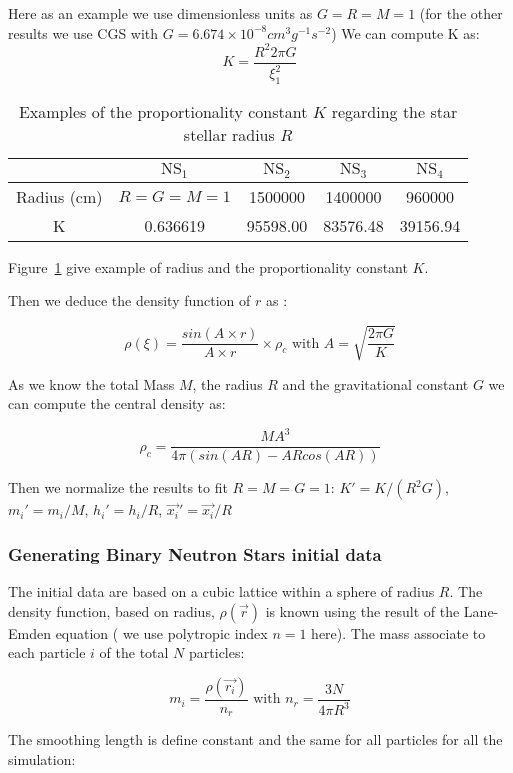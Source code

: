 Here as an example we use dimensionless units as $G=R=M=1$ (for the other results we use CGS with $G = 6.674 \times 10^{-8} cm^3g^{-1}s^{-2}$) 
We can compute K as: 
\begin{equation}
\label{eq:constant}
K = \frac{R^2  2 \pi G}{\xi_1^2}
\end{equation}
%
\begin{table}[t!]
\centering
\begin{tabular}{|c|c|c|c|c|}
\hline
 & $\mbox{NS}_1$ & $\mbox{NS}_2$ & $\mbox{NS}_3$ & $\mbox{NS}_4$ \\ 
\hline 
Radius (cm) & $R=G=M=1$ & 1500000 & 1400000 & 960000 \\ 
\hline 
K & 0.636619 & 95598.00 & 83576.48 & 39156.94\\ 
\hline 
\end{tabular}
\caption{Examples of the proportionality constant $K$ regarding the star stellar radius $R$}
\label{tab:example_radius_k}
\end{table} 
Figure~\ref{tab:example_radius_k} give example of radius and the proportionality constant $K$.


Then we deduce the density function of $r$ as :

$$\rho(\xi) = \frac{sin(A\times r)}{A \times r} \times \rho_c \mbox{ with } A = \sqrt{\frac{2\pi G}{K}}
$$

As we know the total Mass $M$, the radius $R$ and the gravitational constant $G$ we can compute the central density as: 

$$ \rho_c = \frac{M A^3}{4 \pi (sin(AR)-ARcos(AR)) } $$

Then we normalize the results to fit $R = M = G = 1$: $K' = K/(R^2G) $, $m_i' = m_i/M $, $h_i' = h_i / R$, $\vec{x_i}' = \vec{x_i}/R$ 

\subsubsection{Generating Binary Neutron Stars initial data}
\label{sec:equi}

The initial data are based on a cubic lattice within a sphere of radius $R$.
The density function, based on radius, $\rho(\vec{r})$ is known using the result of the Lane-Emden equation ( we use polytropic index $n = 1$ here). 
The mass associate to each particle $i$ of the total $N$ particles: 

$$ m_i = \frac{\rho(\vec{r_i})}{n_r} \mbox{ with } n_r = \frac{3N}{4 \pi R^3}$$ 

The smoothing length is define constant and the same for all particles for all the simulation:

